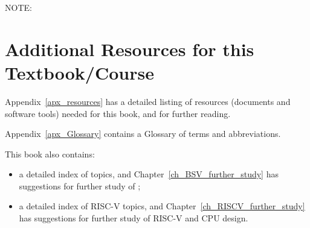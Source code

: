 
\vspace{1ex}

NOTE: 

\vspace{1ex}



\section{Additional Resources for this Textbook/Course}

Appendix~\ref{apx_resources} has a detailed listing of resources
(documents and software tools) needed for this book, and for further
reading.

Appendix~\ref{apx_Glossary} contains a Glossary of terms and
abbreviations.

This book also contains:

\begin{itemize}

 \item a detailed index of {\BSV} topics, and
       Chapter~\ref{ch_BSV_further_study} has suggestions for further
       study of {\BSV};

 \item a detailed index of RISC-V topics, and
       Chapter~\ref{ch_RISCV_further_study} has suggestions for
       further study of RISC-V and CPU design.

 \end{itemize}


